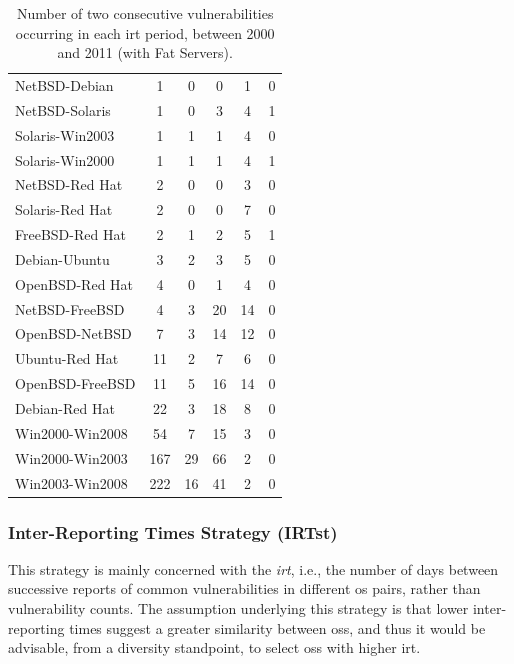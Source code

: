 \begin{table}[!ht]
\begin{center}
{\begin{tabular}{|l||c c c c c|}
NetBSD-Debian & 1 & 0 & 0 & 1 & 0 \\
NetBSD-Solaris & 1 & 0 & 3 & 4 & 1 \\
Solaris-Win2003 & 1 & 1 & 1 & 4 & 0 \\
Solaris-Win2000 & 1 & 1 & 1 & 4 & 1 \\
NetBSD-Red Hat & 2 & 0 & 0 & 3 & 0 \\
Solaris-Red Hat & 2 & 0 & 0 & 7 & 0\\
FreeBSD-Red Hat & 2 & 1 & 2 & 5 & 1\\
Debian-Ubuntu & 3 & 2 & 3 & 5 & 0\\
OpenBSD-Red Hat & 4 & 0 & 1 & 4 & 0\\
NetBSD-FreeBSD & 4 & 3 & 20 & 14 & 0 \\
OpenBSD-NetBSD & 7 & 3 & 14 & 12 & 0 \\
Ubuntu-Red Hat & 11 & 2 & 7 & 6 & 0 \\
OpenBSD-FreeBSD & 11 & 5 & 16 & 14 & 0 \\
Debian-Red Hat & 22 & 3 & 18 & 8 & 0 \\
Win2000-Win2008 & 54 & 7 & 15 & 3 & 0 \\
Win2000-Win2003 & 167 & 29 & 66 & 2 & 0 \\
Win2003-Win2008 & 222 & 16 & 41 & 2 & 0 \\ \hline
\end{tabular}
\caption{Number of two consecutive vulnerabilities occurring in each \gls{irt} period, between 2000 and 2011 (with Fat Servers).}
\label{tab:pairs_irt}
}
\end{center}
\end{table}



\subsubsection*{Inter-Reporting Times Strategy (IRTst)} \label{IRT} 
This strategy is mainly concerned with the \emph{\gls{irt}}, i.e., the number of days between successive reports of common vulnerabilities in different \gls{os} pairs, rather than vulnerability counts. 
The assumption underlying this strategy is that lower inter-reporting times suggest a greater similarity between \glspl{os}, and thus it would be advisable, from a diversity standpoint, to select \glspl{os} with higher \gls{irt}.


